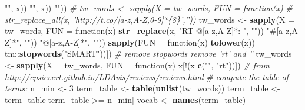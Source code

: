 \documentclass[12pt,]{article}
\newenvironment{Shaded}{\begin{snugshade}}{\end{snugshade}}
\newcommand{\KeywordTok}[1]{\textcolor[rgb]{0.13,0.29,0.53}{\textbf{{#1}}}}
\newcommand{\DataTypeTok}[1]{\textcolor[rgb]{0.13,0.29,0.53}{{#1}}}
\newcommand{\DecValTok}[1]{\textcolor[rgb]{0.00,0.00,0.81}{{#1}}}
\newcommand{\CharTok}[1]{\textcolor[rgb]{0.31,0.60,0.02}{{#1}}}
\newcommand{\StringTok}[1]{\textcolor[rgb]{0.31,0.60,0.02}{{#1}}}
\newcommand{\CommentTok}[1]{\textcolor[rgb]{0.56,0.35,0.01}{\textit{{#1}}}}
\newcommand{\OtherTok}[1]{\textcolor[rgb]{0.56,0.35,0.01}{{#1}}}
\newcommand{\NormalTok}[1]{{#1}}
\begin{document}
\begin{Shaded}
\begin{Highlighting}[]
{{{{{{{{{{{{{{{{{{{{{{{    \StringTok{""}\NormalTok{, x)) %
    \StringTok{""}\NormalTok{, x)) %
    \StringTok{""}\NormalTok{))}
\CommentTok{# tw_words <- sapply(X = tw_words, FUN = function(x)}
\CommentTok{# str_replace_all(x, 'http://t.co/[a-z,A-Z,0-9]*\{8\}',''))}
\NormalTok{tw_words <-}\StringTok{ }\KeywordTok{sapply}\NormalTok{(}\DataTypeTok{X =} \NormalTok{tw_words, }\DataTypeTok{FUN =} \NormalTok{function(x) }\KeywordTok{str_replace}\NormalTok{(x, }
    \StringTok{"RT @[a-z,A-Z]*: "}\NormalTok{, }\StringTok{""}\NormalTok{)) %
    \StringTok{"#[a-z,A-Z]*"}\NormalTok{, }\StringTok{""}\NormalTok{)) %
    \StringTok{"@[a-z,A-Z]*"}\NormalTok{, }\StringTok{""}\NormalTok{)) %
\KeywordTok{sapply}\NormalTok{(}\DataTypeTok{FUN =} \NormalTok{function(x) }\KeywordTok{tolower}\NormalTok{(x)) %
\StringTok{    }\NormalTok{tm::}\KeywordTok{stopwords}\NormalTok{(}\StringTok{"SMART"}\NormalTok{))])}
\CommentTok{# remove stopwords remove 'rt' and ''}
\NormalTok{tw_words <-}\StringTok{ }\KeywordTok{sapply}\NormalTok{(}\DataTypeTok{X =} \NormalTok{tw_words, }\DataTypeTok{FUN =} \NormalTok{function(x) x[!(x %
\StringTok{    }\KeywordTok{c}\NormalTok{(}\StringTok{""}\NormalTok{, }\StringTok{"rt"}\NormalTok{))])}
\CommentTok{# from http://cpsievert.github.io/LDAvis/reviews/reviews.html}
\CommentTok{# compute the table of terms:}
\NormalTok{n_min <-}\StringTok{ }\DecValTok{3}
\NormalTok{term_table <-}\StringTok{ }\KeywordTok{table}\NormalTok{(}\KeywordTok{unlist}\NormalTok{(tw_words)) %
\NormalTok{term_table <-}\StringTok{ }\NormalTok{term_table[term_table >=}\StringTok{ }\NormalTok{n_min]}
\NormalTok{vocab <-}\StringTok{ }\KeywordTok{names}\NormalTok{(term_table)}
}}}}}}}}}}}}}}}}}}}}}}}}}}}}}}}
\end{Highlighting}
\end{Shaded}
\end{document}

